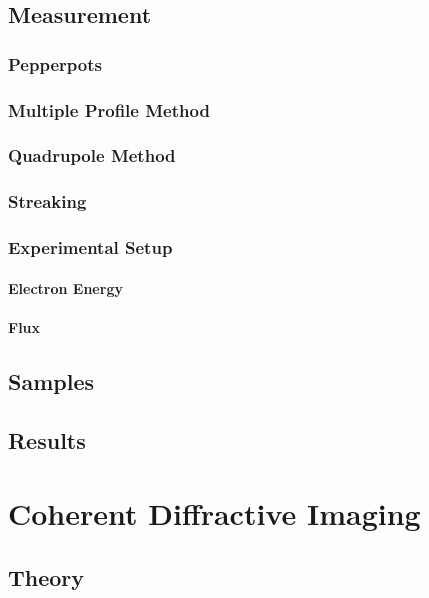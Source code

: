 \section{Measurement}

\subsection{Pepperpots}

\subsection{Multiple Profile Method}

\subsection{Quadrupole Method}

\subsection{Streaking}

\subsection{Experimental Setup}

\subsubsection{Electron Energy}

\subsubsection{Flux}

\section{Samples}

\section{Results}


\chapter{Coherent Diffractive Imaging}

\section{Theory}

